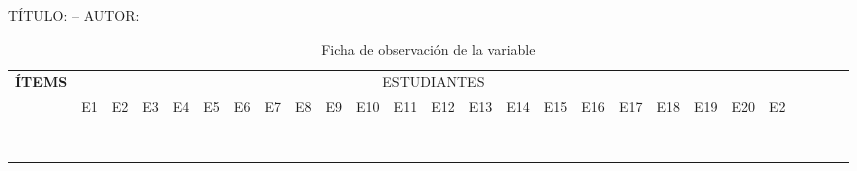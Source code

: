 \documentclass[12pt,a4paper]{article}
\newcommand{\ce}{\centering}
\newcommand\Tstrut{\rule{0pt}{2.35ex}}
\begin{document}
\begin{landscape}
	TÍTULO: \titulo -- AUTOR: \autor
	\begin{table}[ht!]\caption{Ficha de observación de la variable\MakeTextLowercase{\variablei}}
		\centering  \renewcommand\tabcolsep{0.1cm}\renewcommand{}
		\scriptsize
		\begin{tabular}{|l|l|l|l|l|l|l|l|l|l|l|l|l|l|l|l|l|l|l|l|l|l|l|l|l|l|}
			\hline
			\multirow{2}{*}{ \ce\bf ÍTEMS} & \multicolumn{21}{c|}{ESTUDIANTES}\Tstrut                                                                                                                       \\\cline{2-22}
			                               & E1                                       & E2 & E3 & E4 & E5 & E6 & E7 & E8 & E9 & E10 & E11 & E12 & E13 & E14 & E15 & E16 & E17 & E18 & E19 & E20 & E2\Tstrut \\\hline
			                               &                                          &    &    &    &    &    &    &    &    &     &     &     &     &     &     &     &     &     &     &     &           \\\hline
			                               &                                          &    &    &    &    &    &    &    &    &     &     &     &     &     &     &     &     &     &     &     &           \\\hline
			                               &                                          &    &    &    &    &    &    &    &    &     &     &     &     &     &     &     &     &     &     &     &           \\\hline
			                               &                                          &    &    &    &    &    &    &    &    &     &     &     &     &     &     &     &     &     &     &     &           \\\hline
			                               &                                          &    &    &    &    &    &    &    &    &     &     &     &     &     &     &     &     &     &     &     &           \\\hline
			                               &                                          &    &    &    &    &    &    &    &    &     &     &     &     &     &     &     &     &     &     &     &           \\\hline
			                               &                                          &    &    &    &    &    &    &    &    &     &     &     &     &     &     &     &     &     &     &     &           \\\hline
			                               &                                          &    &    &    &    &    &    &    &    &     &     &     &     &     &     &     &     &     &     &     &           \\\hline

\end{tabular}
\end{table}
\end{landscape}
\end{document}
